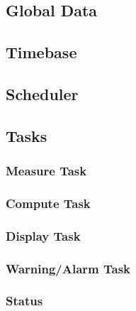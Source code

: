 \documentclass[12pt]{article} %
\begin{document}
\subsection{Global Data}



\subsection{Timebase}


\subsection{Scheduler}



\subsection{Tasks}
\subsubsection{Measure Task}



\subsubsection{Compute Task}



\subsubsection{Display Task}



\subsubsection{Warning/Alarm Task}



\subsubsection{Status}


\end{document}
